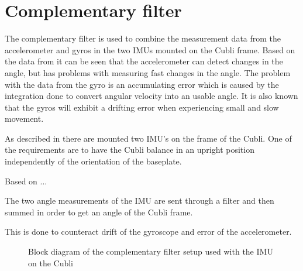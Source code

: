 \chapter{Complementary filter}\label{chap:CompFilter}
The complementary filter is used to combine the measurement data from the accelerometer and gyros in the two IMUs mounted on the Cubli frame. 
Based on the data from  it can be seen that the accelerometer can detect changes in the angle, but has problems with measuring fast changes in the angle. 
The problem with the data from the gyro is an accumulating error which is caused by the integration done to convert angular velocity into an usable angle. It is also known that the gyros will exhibit a drifting error when experiencing small and slow movement.
 
As described in  there are mounted two IMU's on the frame of the Cubli. One of the requirements are to have the Cubli balance in an upright position independently of the orientation of the baseplate.

Based on ... 

The two angle measurements of the IMU are sent through a filter and then summed in order to get an angle of the Cubli frame.
 
This is done to counteract drift of the gyroscope and error of the accelerometer. 

\begin{figure}[H]
	
	\centering
	\caption{Block diagram of the complementary filter setup used with the IMU on the Cubli}
	\label{blockDrawingComplementaryFilter}
\end{figure}

